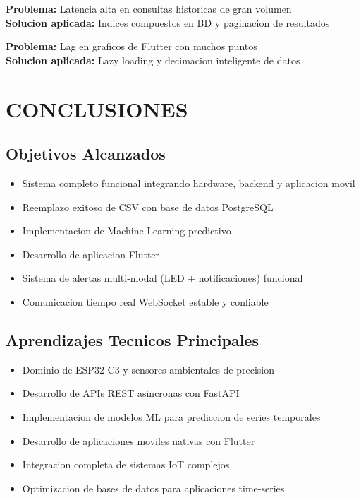 \documentclass[11pt,letterpaper]{article}
\begin{document}
\textbf{Problema:} Latencia alta en consultas historicas de gran volumen\\
\textbf{Solucion aplicada:} Indices compuestos en BD y paginacion de resultados

\textbf{Problema:} Lag en graficos de Flutter con muchos puntos\\
\textbf{Solucion aplicada:} Lazy loading y decimacion inteligente de datos

\section{CONCLUSIONES}

\subsection{Objetivos Alcanzados}
\begin{itemize}
    \item Sistema completo funcional integrando hardware, backend y aplicacion movil
    \item Reemplazo exitoso de CSV con base de datos PostgreSQL
    \item Implementacion de Machine Learning predictivo
    \item Desarrollo de aplicacion Flutter
    \item Sistema de alertas multi-modal (LED + notificaciones) funcional
    \item Comunicacion tiempo real WebSocket estable y confiable
\end{itemize}

\subsection{Aprendizajes Tecnicos Principales}
\begin{itemize}
    \item Dominio de ESP32-C3 y sensores ambientales de precision
    \item Desarrollo de APIs REST asincronas con FastAPI
    \item Implementacion de modelos ML para prediccion de series temporales
    \item Desarrollo de aplicaciones moviles nativas con Flutter
    \item Integracion completa de sistemas IoT complejos
    \item Optimizacion de bases de datos para aplicaciones time-series
\end{itemize}
\end{document}
